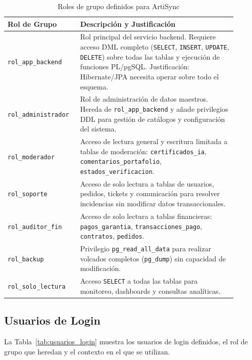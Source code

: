 \documentclass[conference, onecolumn]{IEEEtran}
\begin{document}
\begin{table}[H]
\centering
\caption{Roles de grupo definidos para ArtiSync}
\label{tab:roles_grupo}
\scriptsize
\begin{tabular}{>{\raggedright\arraybackslash}p{0.26\linewidth} >{\raggedright\arraybackslash}p{0.64\linewidth}}
\toprule
\textbf{Rol de Grupo} & \textbf{Descripción y Justificación} \\
\midrule
\texttt{rol\_app\_backend} & Rol principal del servicio backend. Requiere acceso DML completo (\texttt{SELECT}, \texttt{INSERT}, \texttt{UPDATE}, \texttt{DELETE}) sobre todas las tablas y ejecución de funciones PL/pgSQL. Justificación: Hibernate/JPA necesita operar sobre todo el esquema. \\
\midrule
\texttt{rol\_administrador} & Rol de administración de datos maestros. Hereda de \texttt{rol\_app\_backend} y añade privilegios DDL para gestión de catálogos y configuración del sistema. \\
\midrule
\texttt{rol\_moderador} & Acceso de lectura general y escritura limitada a tablas de moderación: \texttt{certificados\_ia}, \texttt{comentarios\_portafolio}, \texttt{estados\_verificacion}. \\
\midrule
\texttt{rol\_soporte} & Acceso de solo lectura a tablas de usuarios, pedidos, tickets y comunicación para resolver incidencias sin modificar datos transaccionales. \\
\midrule
\texttt{rol\_auditor\_fin} & Acceso de solo lectura a tablas financieras: \texttt{pagos\_garantia}, \texttt{transacciones\_pago}, \texttt{contratos}, \texttt{pedidos}. \\
\midrule
\texttt{rol\_backup} & Privilegio \texttt{pg\_read\_all\_data} para realizar volcados completos (\texttt{pg\_dump}) sin capacidad de modificación. \\
\midrule
\texttt{rol\_solo\_lectura} & Acceso \texttt{SELECT} a todas las tablas para monitoreo, dashboards y consultas analíticas. \\
\bottomrule
\end{tabular}
\end{table}

\subsection{Usuarios de Login}

La Tabla~\ref{tab:usuarios_login} muestra los usuarios de login definidos, el rol de grupo que heredan y el contexto en el que se utilizan.
\end{document}

